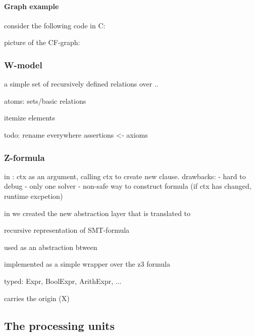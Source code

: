 \paragraph{Graph example}
\label{ch:impl:model:xgraph:example}

consider the following code in C:

picture of the CF-graph:


%

\subsubsection{W-model}
\label{ch:impl:model:wmodel}

a simple set of recursively defined relations over ..

atoms: sets/basic relations

itemize elements

todo: rename everywhere assertions <- axioms


\subsubsection{Z-formula}
\label{ch:impl:model:zformula}


in \porthos{} : ctx as an argument, calling ctx to create new clause. 
drawbacks:
- hard to debug
- only one solver
- non-safe way to construct formula (if ctx has changed, runtime excpetion)

in \porthos[2] we created the new abstraction layer \zformula[] that is translated to 

recursive representation of SMT-formula

used as an abstraction btween

implemented as a simple wrapper over the z3 formula

typed: Expr, BoolExpr, ArithExpr, ...

carries the origin (X)


\subsection{The processing units} %
\label{ch:impl:proc}



